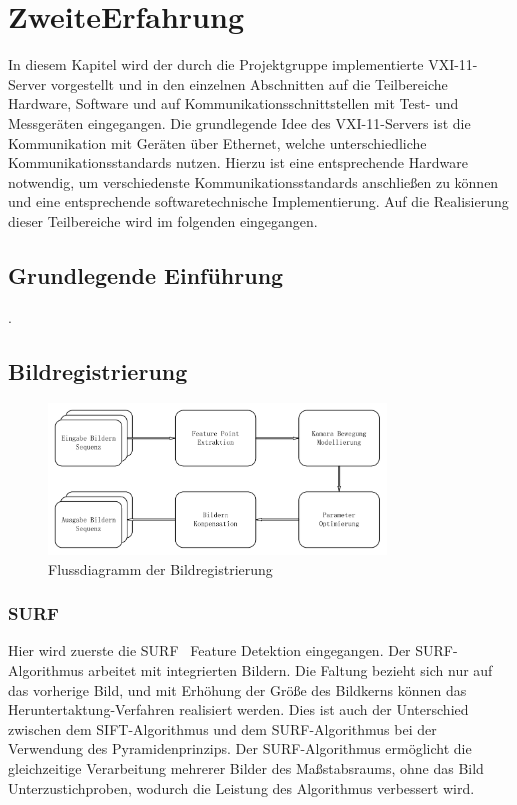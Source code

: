 \chapter{ZweiteErfahrung} \label{cha:ZweiteErfahrung}

In diesem Kapitel wird der durch die Projektgruppe implementierte VXI-11-Server vorgestellt und in den einzelnen Abschnitten auf die Teilbereiche Hardware, Software und auf Kommunikationsschnittstellen mit Test- und Messgeräten eingegangen. Die grundlegende Idee des VXI-11-Servers ist die Kommunikation mit Geräten über Ethernet, welche unterschiedliche Kommunikationsstandards nutzen. Hierzu ist eine entsprechende Hardware notwendig, um verschiedenste Kommunikationsstandards anschließen zu können und eine entsprechende softwaretechnische Implementierung. Auf die Realisierung dieser Teilbereiche wird im folgenden eingegangen.

\section{Grundlegende Einführung} 
\cite{lin1973}.

\section{Bildregistrierung} 

\begin{figure}[htb]
 \centering 
 \includegraphics[keepaspectratio,width=0.8\textwidth]{images/0_Image_Registration_Flussdiagramm.pdf}
 \caption{Flussdiagramm der Bildregistrierung}
 \label{fig:Bildregistrierung}
\end{figure}

\subsection{SURF}
Hier wird zuerste die SURF~\cite{Surf} Feature Detektion eingegangen. Der SURF-Algorithmus arbeitet mit integrierten Bildern. Die Faltung bezieht sich nur auf das vorherige Bild, und mit Erhöhung der Größe des Bildkerns können das Heruntertaktung-Verfahren realisiert werden. Dies ist auch der Unterschied zwischen dem SIFT-Algorithmus und dem SURF-Algorithmus bei der Verwendung des Pyramidenprinzips. Der SURF-Algorithmus ermöglicht die gleichzeitige Verarbeitung mehrerer Bilder des Maßstabsraums, ohne das Bild Unterzustichproben, wodurch die Leistung des Algorithmus verbessert wird.

